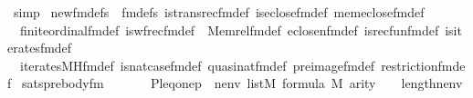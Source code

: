 \begin{isabellebody}
\ simp\isanewline
{}\isamarkupfalse%
%
\endisatagproof
{\isafoldproof}%
%
\isadelimproof
\isanewline
%
\endisadelimproof
\isanewline
{}\isamarkupfalse%
\ new{\isacharunderscore}{\kern0pt}fm{\isacharunderscore}{\kern0pt}defs\ {\isacharequal}{\kern0pt}\ fm{\isacharunderscore}{\kern0pt}defs\ is{\isacharunderscore}{\kern0pt}transrec{\isacharunderscore}{\kern0pt}fm{\isacharunderscore}{\kern0pt}def\ is{\isacharunderscore}{\kern0pt}eclose{\isacharunderscore}{\kern0pt}fm{\isacharunderscore}{\kern0pt}def\ mem{\isacharunderscore}{\kern0pt}eclose{\isacharunderscore}{\kern0pt}fm{\isacharunderscore}{\kern0pt}def\isanewline
\ \ finite{\isacharunderscore}{\kern0pt}ordinal{\isacharunderscore}{\kern0pt}fm{\isacharunderscore}{\kern0pt}def\ is{\isacharunderscore}{\kern0pt}wfrec{\isacharunderscore}{\kern0pt}fm{\isacharunderscore}{\kern0pt}def\ \ Memrel{\isacharunderscore}{\kern0pt}fm{\isacharunderscore}{\kern0pt}def\ eclose{\isacharunderscore}{\kern0pt}n{\isacharunderscore}{\kern0pt}fm{\isacharunderscore}{\kern0pt}def\ is{\isacharunderscore}{\kern0pt}recfun{\isacharunderscore}{\kern0pt}fm{\isacharunderscore}{\kern0pt}def\ is{\isacharunderscore}{\kern0pt}iterates{\isacharunderscore}{\kern0pt}fm{\isacharunderscore}{\kern0pt}def\isanewline
\ \ iterates{\isacharunderscore}{\kern0pt}MH{\isacharunderscore}{\kern0pt}fm{\isacharunderscore}{\kern0pt}def\ is{\isacharunderscore}{\kern0pt}nat{\isacharunderscore}{\kern0pt}case{\isacharunderscore}{\kern0pt}fm{\isacharunderscore}{\kern0pt}def\ quasinat{\isacharunderscore}{\kern0pt}fm{\isacharunderscore}{\kern0pt}def\ pre{\isacharunderscore}{\kern0pt}image{\isacharunderscore}{\kern0pt}fm{\isacharunderscore}{\kern0pt}def\ restriction{\isacharunderscore}{\kern0pt}fm{\isacharunderscore}{\kern0pt}def\isanewline
\isanewline
{}\isamarkupfalse%
\ sats{\isacharunderscore}{\kern0pt}prebody{\isacharunderscore}{\kern0pt}fm{\isacharcolon}{\kern0pt}\isanewline
\ \ \isanewline
\ \ \ \ {\isachardoublequoteopen}{\isacharbrackleft}{\kern0pt}P{\isacharcomma}{\kern0pt}leq{\isacharcomma}{\kern0pt}one{\isacharcomma}{\kern0pt}p{\isacharcomma}{\kern0pt}{\isasymrho}{\isacharbrackright}{\kern0pt}\ {\isacharat}{\kern0pt}\ nenv\ {\isasymin}list{\isacharparenleft}{\kern0pt}M{\isacharparenright}{\kern0pt}{\isachardoublequoteclose}\ {\isachardoublequoteopen}{\isasymphi}{\isasymin}formula{\isachardoublequoteclose}\ {\isachardoublequoteopen}{\isasymalpha}{\isasymin}M{\isachardoublequoteclose}\ {\isachardoublequoteopen}arity{\isacharparenleft}{\kern0pt}{\isasymphi}{\isacharparenright}{\kern0pt}\ {\isasymle}\ {}\ {\isacharhash}{\kern0pt}{\isacharplus}{\kern0pt}\ length{\isacharparenleft}{\kern0pt}nenv{\isacharparenright}{\kern0pt}{\isachardoublequoteclose}\isanewline

\end{isabellebody}

